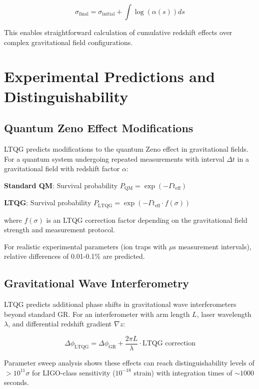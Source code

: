\documentclass[12pt,a4paper]{article}
\begin{document}
\begin{equation}
\sigma_{\text{final}} = \sigma_{\text{initial}} + \int \log(\alpha(s)) ds
\end{equation}

This enables straightforward calculation of cumulative redshift effects over complex gravitational field configurations.

\section{Experimental Predictions and Distinguishability}

\subsection{Quantum Zeno Effect Modifications}

LTQG predicts modifications to the quantum Zeno effect in gravitational fields. For a quantum system undergoing repeated measurements with interval $\Delta t$ in a gravitational field with redshift factor $\alpha$:

\textbf{Standard QM}: Survival probability $P_{\text{QM}} = \exp(-\Gamma t_{\text{eff}})$

\textbf{LTQG}: Survival probability $P_{\text{LTQG}} = \exp(-\Gamma t_{\text{eff}} \cdot f(\sigma))$

where $f(\sigma)$ is an LTQG correction factor depending on the gravitational field strength and measurement protocol.

For realistic experimental parameters (ion traps with $\mu$s measurement intervals), relative differences of 0.01-0.1\% are predicted.

\subsection{Gravitational Wave Interferometry}

LTQG predicts additional phase shifts in gravitational wave interferometers beyond standard GR. For an interferometer with arm length $L$, laser wavelength $\lambda$, and differential redshift gradient $\nabla z$:

\begin{equation}
\Delta \phi_{\text{LTQG}} = \Delta \phi_{\text{GR}} + \frac{2\pi L}{\lambda} \cdot \text{LTQG correction}
\end{equation}

Parameter sweep analysis shows these effects can reach distinguishability levels of $>10^{11}\sigma$ for LIGO-class sensitivity ($10^{-18}$ strain) with integration times of $\sim 1000$ seconds.
\end{document}
